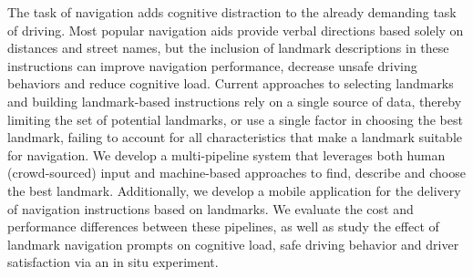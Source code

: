 The task of navigation adds cognitive distraction to the already demanding task of driving. Most popular navigation aids provide verbal directions based solely on distances and street names, but the inclusion of landmark descriptions in these instructions can improve navigation performance, decrease unsafe driving behaviors and reduce cognitive load. Current approaches to selecting landmarks and building landmark-based instructions rely on a single source of data, thereby limiting the set of potential landmarks, or use a single factor in choosing the best landmark, failing to account for all characteristics that make a landmark suitable for navigation. We develop a multi-pipeline system that leverages both human (crowd-sourced) input and machine-based approaches to find, describe and choose the best landmark. Additionally, we develop a mobile application for the delivery of navigation instructions based on landmarks. We evaluate the cost and performance differences between these pipelines, as well as study the effect of landmark navigation prompts on cognitive load, safe driving behavior and driver satisfaction via an in situ experiment.

